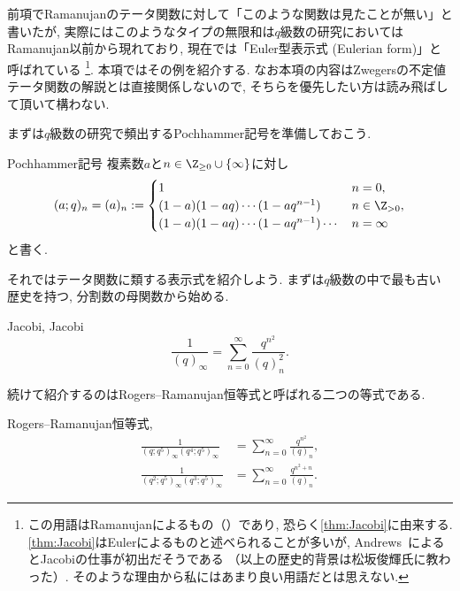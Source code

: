 \documentclass[11pt,b5paper,oneside,lualatex]{ltjsarticle} %
\numberwithin{equation}{section} %
\begin{document}

前項でRamanujanのテータ関数に対して「このような関数は見たことが無い」と書いたが, 実際にはこのようなタイプの無限和は$ q $級数の研究においてはRamanujan以前から現れており, 現在では「Euler型表示式 (Eulerian form)」と呼ばれている
\footnote{この用語はRamanujanによるもの（\cite[119ページ]{魅惑}）であり, 恐らく\cref{thm:Jacobi}に由来する. 
	\cref{thm:Jacobi}はEulerによるものと述べられることが多いが, Andrews~\cite{Andrews_combi}によるとJacobiの仕事が初出だそうである
	（以上の歴史的背景は松坂俊輝氏に教わった）. 
	そのような理由から私にはあまり良い用語だとは思えない. }. 
本項ではその例を紹介する. 
なお本項の内容はZwegersの不定値テータ関数の解説とは直接関係しないので, そちらを優先したい方は読み飛ばして頂いて構わない. 

まずは$ q $級数の研究で頻出するPochhammer記号を準備しておこう. 

\begin{dfn}{Pochhammer記号}{}
	複素数$ a $と$ n \in \Z_{\ge 0} \cup \{ \infty \} $に対し
	\[
	(a; q)_n = (a)_n :=
	\begin{cases}
		1 & n=0, \\
		(1 - a) (1 - aq) \cdots (1 - aq^{n-1}) & n \in \Z_{>0}, \\
		(1 - a) (1 - aq) \cdots (1 - aq^{n-1}) \cdots & n = \infty
	\end{cases}
	\]
	と書く. 
\end{dfn}

それではテータ関数に類する表示式を紹介しよう. 
まずは$ q $級数の中で最も古い歴史を持つ, 分割数の母関数から始める. 

\begin{thm}{Jacobi, {\cite[式 (8.2)]{整数の分割}}}{Jacobi}
	\[
	\frac{1}{(q)_\infty} = \sum_{n=0}^{\infty} \frac{q^{n^2}}{(q)_n^2}.
	\]
\end{thm}

続けて紹介するのはRogers--Ramanujan恒等式と呼ばれる二つの等式である. 

\begin{thm}{Rogers--Ramanujan恒等式, {\cite[8.4節]{整数の分割}}}{}
	\begin{align}
		\frac{1}{(q; q^5)_\infty (q^4; q^5)_\infty} 
		&=
		\sum_{n=0}^{\infty} \frac{q^{n^2}}{(q)_n},
		\\
		\frac{1}{(q^2; q^5)_\infty (q^3; q^5)_\infty} 
		&=
		\sum_{n=0}^{\infty} \frac{q^{n^2 + n}}{(q)_n}.
	\end{align}
\end{thm}
\end{document}
